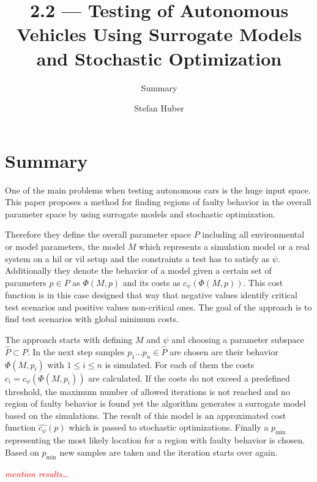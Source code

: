 \documentclass[oneside, notitlepage, twocolumn]{scrartcl}
\title{\LARGE 2.2 --- Testing of Autonomous Vehicles Using Surrogate Models and Stochastic Optimization}
\subtitle{Summary}
\author{Stefan Huber}
\newcommand{\draft}[1]{\textcolor{red}{\textit{#1}}}
\begin{document}
\maketitle

\section{Summary}
One of the main problems when testing autonomous cars is the huge input space.
This paper proposes a method for finding regions of faulty behavior in the overall parameter space by using surrogate models and stochastic optimization.\par
Therefore they define the overall parameter space \(P\) including all environmental or model parameters, the model \(M\) which represents a simulation model or a real system on a \gls{hil} or \gls{vil} setup and the constraints a test has to satisfy as \(\psi\).
Additionally they denote the behavior of a model given a certain set of parameters \(p\in P\) as \(\Phi (M, p)\) and its costs as \(c_\psi(\Phi(M, p))\).
This cost function is in this case designed that way that negative values identify critical test scenarios and positive values non-critical ones.
The goal of the approach is to find test scenarios with global minimum costs.\par
The approach starts with defining \(M\) and \(\psi\) and choosing a parameter subspace \(\hat{P}\subset P\).
In the next step samples \(p_1\ldots p_n\in \hat{P}\) are chosen are their behavior \(\Phi (M, p_i)\) with \(1 \leq i \leq n\) is simulated.
For each of them the costs \(c_i=c_\psi(\Phi(M, p_i))\) are calculated.
If the costs do not exceed a predefined threshold, the maximum number of allowed iterations is not reached and no region of faulty behavior is found yet the algorithm generates a surrogate model based on the simulations.
The result of this model is an approximated cost function \(\hat{c_\psi}(p)\) which is passed to stochastic optimizations.
Finally a \(p_\min\) representing the most likely location for a region with faulty behavior is chosen.
Based on \(p_\min\) new samples are taken and the iteration starts over again.\par
\draft{mention results\ldots}
\end{document}
